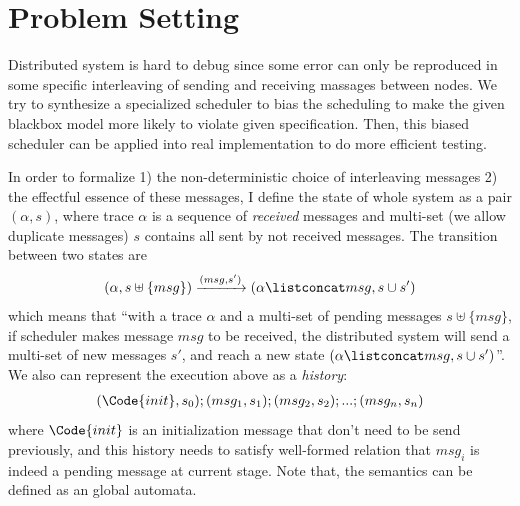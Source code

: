 \section{Problem Setting}

Distributed system is hard to debug since some error can only be reproduced in some specific interleaving of sending and receiving massages between nodes. We try to synthesize a specialized scheduler to bias the scheduling to make the given blackbox model more likely to violate given specification. Then, this biased scheduler can be applied into real implementation to do more efficient testing.

In order to formalize 1) the non-deterministic choice of interleaving messages 2) the effectful essence of these messages, I define the state of whole system as a pair $(\alpha, s)$, where trace $\alpha$ is a sequence of \emph{received} messages and multi-set (we allow duplicate messages) $s$ contains all sent by not received messages. The transition between two states are
\begin{align*}
    (\alpha, s \uplus \{msg\}) \xrightarrow{(msg, s')} (\alpha \listconcat msg, s \cup s')
\end{align*}\noindent
which means that ``with a trace $\alpha$ and a multi-set of pending messages $s \uplus \{msg\}$, if scheduler makes message $msg$ to be received, the distributed system will send a multi-set of new messages $s'$, and reach a new state $(\alpha \listconcat msg, s \cup s')$''. We also can represent the execution above as a \emph{history}:
\begin{align*}
   (\Code{init}, s_0);(msg_1, s_1);(msg_2, s_2);...;(msg_n, s_n)
\end{align*}\noindent
where $\Code{init}$ is an initialization message that don't need to be send previously, and this history needs to satisfy well-formed relation that $msg_i$ is indeed a pending message at current stage. Note that, the semantics can be defined as an global automata.

